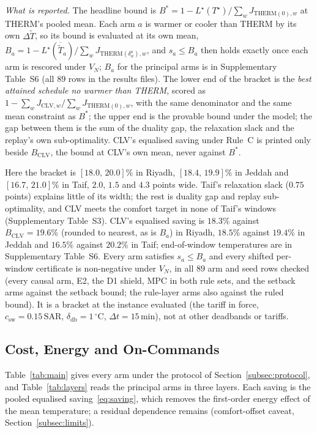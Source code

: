 \documentclass[pdflatex,sn-mathphys-num,iicol]{sn-jnl}
\theoremstyle{thmstyleone}\newtheorem{proposition}{Proposition}\newtheorem{corollary}{Corollary}
\theoremstyle{thmstyletwo}\newtheorem{remark}{Remark}\newtheorem{observation}{Observation}
\theoremstyle{thmstylethree}\newtheorem{definition}{Definition}
\newcommand{\deadband}{\delta_{\mathrm{db}}}
\newcommand{\csw}{c_{\mathrm{sw}}}
\newcommand{\SAR}{\text{SAR}}
\begin{document}
\emph{What is reported.} The headline bound is $B^{\ast}=1-L^{\star}(T^{\star})/\sum_wJ_{\mathrm{THERM}(0),w}$ at THERM's pooled mean. Each arm $a$ is warmer or cooler than THERM by its own $\Delta\tilde T$, so its bound is evaluated at its own mean, $B_a=1-L^{\star}(\overline{\tilde T}_a)/\sum_wJ_{\mathrm{THERM}(\delta^a_w),w}$, and $s_a\le B_a$ then holds exactly once each arm is rescored under $V_N$; $B_a$ for the principal arms is in Supplementary Table~S6 (all $89$ rows in the results files). The lower end of the bracket is the \emph{best attained schedule no warmer than THERM}, scored as $1-\sum_wJ_{\mathrm{CLV},w}/\sum_wJ_{\mathrm{THERM}(0),w}$, with the same denominator and the same mean constraint as $B^{\ast}$; the upper end is the provable bound under the model; the gap between them is the sum of the duality gap, the relaxation slack and the replay's own sub-optimality. CLV's equalised saving under Rule~C is printed only beside $B_{\mathrm{CLV}}$, the bound at CLV's own mean, never against $B^{\ast}$.

Here the bracket is $[18.0,\,20.0]\%$ in Riyadh, $[18.4,\,19.9]\%$ in Jeddah and $[16.7,\,21.0]\%$ in Taif, $2.0$, $1.5$ and $4.3$ points wide. Taif's relaxation slack ($0.75$ points) explains little of its width; the rest is duality gap and replay sub-optimality, and CLV meets the comfort target in none of Taif's windows (Supplementary Table~S3). CLV's equalised saving is $18.3\%$ against $B_{\mathrm{CLV}}=19.6\%$ (rounded to nearest, as is $B_a$) in Riyadh, $18.5\%$ against $19.4\%$ in Jeddah and $16.5\%$ against $20.2\%$ in Taif; end-of-window temperatures are in Supplementary Table~S6. Every arm satisfies $s_a\le B_a$ and every shifted per-window certificate is non-negative under $V_N$, in all $89$ arm and seed rows checked (every causal arm, E2, the D1 shield, MPC in both rule sets, and the setback arms against the setback bound; the rule-layer arms also against the ruled bound). It is a bracket at the instance evaluated (the tariff in force, $\csw=0.15\,\SAR$, $\deadband=1\,^\circ$C, $\Delta t=15\,$min), not at other deadbands or tariffs.

\subsection{Cost, Energy and On-Commands}
\label{subsec:consumption}

Table~\ref{tab:main} gives every arm under the protocol of Section~\ref{subsec:protocol}, and Table~\ref{tab:layers} reads the principal arms in three layers. Each saving is the pooled equalised saving~\eqref{eq:saving}, which removes the first-order energy effect of the mean temperature; a residual dependence remains (comfort-offset caveat, Section~\ref{subsec:limits}).
\end{document}

